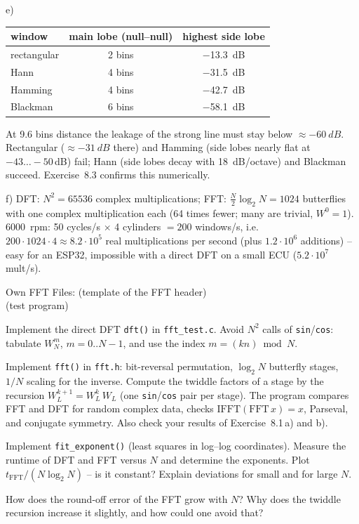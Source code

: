 \begin{solution}
e)
\begin{center}\small
\begin{tabular}{lcc}
\toprule
window & main lobe (null--null) & highest side lobe\\
\midrule
rectangular & 2 bins & \SI{-13.3}{dB}\\
Hann & 4 bins & \SI{-31.5}{dB}\\
Hamming & 4 bins & \SI{-42.7}{dB}\\
Blackman & 6 bins & \SI{-58.1}{dB}\\
\bottomrule
\end{tabular}
\end{center}
At 9.6 bins distance the leakage of the strong line must stay below
$\approx\SI{-60}{dB}$. Rectangular ($\approx\SI{-31}{dB}$ there) and Hamming
(side lobes nearly flat at $-43\dots-50$\,dB) fail; Hann (side lobes decay
with \SI{18}{dB/octave}) and Blackman succeed. Exercise~8.3 confirms this
numerically.

f) DFT: $N^2=65536$ complex multiplications; FFT: $\frac N2\log_2N=1024$
butterflies with one complex multiplication each (64 times fewer; many are
trivial, $W^0=1$). \SI{6000}{rpm}: 50 cycles/s $\times$ 4 cylinders $=200$
windows/s, i.e.\ $200\cdot1024\cdot4\approx8.2\cdot10^5$ real multiplications
per second (plus $1.2\cdot10^6$ additions) -- easy for an ESP32, impossible
with a direct DFT on a small ECU ($5.2\cdot10^7$ mult/s).
\end{solution}

\begin{exercise}{Own FFT}{\JSLinux}
Files:  (template of the FFT header)\\
\phantom{Files: } (test program)
\begin{tasks}
  \item Implement the direct DFT \texttt{dft()} in \texttt{fft\_test.c}.
    Avoid $N^2$ calls of \texttt{sin}/\texttt{cos}: tabulate $W_N^m$,
    $m=0..N-1$, and use the index $m=(kn)\bmod N$.
  \item Implement \texttt{fft()} in \texttt{fft.h}: bit-reversal permutation,
    $\log_2N$ butterfly stages, $1/N$ scaling for the inverse. Compute the
    twiddle factors of a stage by the recursion
    $W_L^{k+1}=W_L^k\,W_L$ (one \texttt{sin}/\texttt{cos} pair per stage).
    The program compares FFT and DFT for random complex data, checks
    $\mathrm{IFFT}(\mathrm{FFT}\,x)=x$, Parseval, and conjugate symmetry. Also
    check your results of Exercise~8.1\,a) and b).
  \item Implement \texttt{fit\_exponent()} (least squares in log--log
    coordinates). Measure the runtime of DFT and FFT versus $N$ and determine
    the exponents. Plot $t_\mathrm{FFT}/(N\log_2N)$ -- is it constant? Explain
    deviations for small and for large $N$.
  \item How does the round-off error of the FFT grow with $N$? Why does the
    twiddle recursion increase it slightly, and how could one avoid that?
\end{tasks}
\end{exercise}

